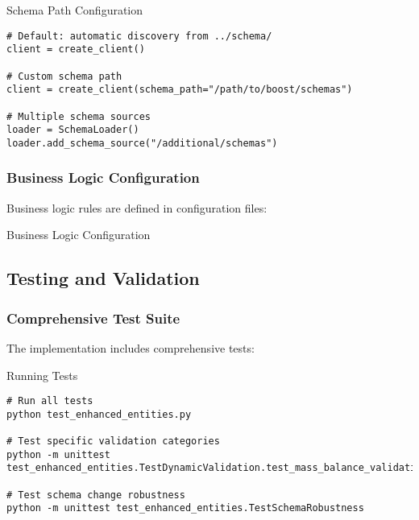 \begin{pythonexample}{Schema Path Configuration}
\begin{verbatim}
# Default: automatic discovery from ../schema/
client = create_client()

# Custom schema path
client = create_client(schema_path="/path/to/boost/schemas")

# Multiple schema sources
loader = SchemaLoader()
loader.add_schema_source("/additional/schemas")
\end{verbatim}
\end{pythonexample}

\subsubsection{Business Logic Configuration}
\label{sec:python-business-config}

Business logic rules are defined in configuration files:

\begin{jsonexample}{Business Logic Configuration}
\end{jsonexample}

\subsection{Testing and Validation}
\label{sec:python-testing}

\subsubsection{Comprehensive Test Suite}
\label{sec:python-test-suite}

The implementation includes comprehensive tests:

\begin{pythonexample}{Running Tests}
\begin{verbatim}
# Run all tests
python test_enhanced_entities.py

# Test specific validation categories
python -m unittest test_enhanced_entities.TestDynamicValidation.test_mass_balance_validation

# Test schema change robustness
python -m unittest test_enhanced_entities.TestSchemaRobustness
\end{verbatim}
\end{pythonexample}

